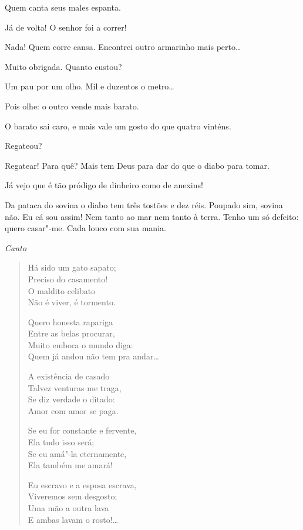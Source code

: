 

   Quem canta seus males espanta.

  Já de volta! O senhor foi a correr!

  Nada! Quem corre cansa. Encontrei outro armarinho mais
perto\ldots{}

   Muito obrigada. Quanto custou?

  Um pau por um olho. Mil e duzentos o metro\ldots{}

  Pois olhe: o outro vende mais barato.

  O barato sai caro, e mais vale um gosto do que quatro vinténs.

  Regateou?

  Regatear! Para quê? Mais tem Deus para dar do que o diabo para
tomar.

  Já vejo que é tão pródigo de dinheiro como de anexins!

  Da pataca do sovina o diabo tem três tostões e dez réis. Poupado
sim, sovina não.
Eu cá sou assim! Nem tanto ao mar nem tanto à terra. Tenho um só defeito: quero
casar"-me. Cada louco com sua mania.

{\smallskip\raggedleft\itshape Canto\par}
\begin{verse} 
Há sido um gato sapato;\\
Preciso do casamento!\\
O maldito celibato\\
Não é viver, é tormento.

Quero honesta rapariga\\
Entre as belas procurar,\\
Muito embora o mundo diga:\\
Quem já andou não tem pra andar\ldots{}

A existência de casado\\
Talvez venturas me traga,\\
Se diz verdade o ditado:\\
Amor com amor se paga.

Se eu for constante e fervente,\\
Ela tudo isso será;\\
Se eu amá"-la eternamente,\\
Ela também me amará!

Eu escravo e a esposa escrava,\\
Viveremos sem desgosto;\\
Uma mão a outra lava\\
E ambas lavam o rosto!\ldots{}
\end{verse}


